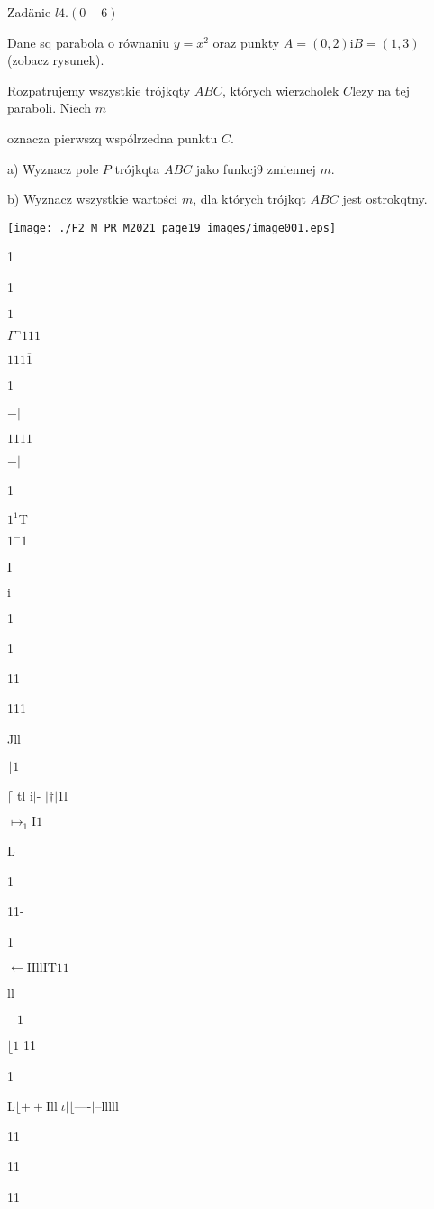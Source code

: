 \documentclass[a4paper,12pt]{article}
\begin{document}
Zadänie $l4. (0-6)$

Dane sq parabola o równaniu $y=x^{2}$ oraz punkty $A=(0,2) \mathrm{i} B=(1,3)$ (zobacz rysunek).

Rozpatrujemy wszystkie trójkqty $ABC$, których wierzcholek $C \mathrm{l}\mathrm{e}\dot{\mathrm{z}}\mathrm{y}$ na tej paraboli. Niech $m$

oznacza pierwszq wspólrzedna punktu $C.$

a) Wyznacz pole $P$ trójkqta $ABC$ jako funkcj9 zmiennej $m.$

b) Wyznacz wszystkie wartości $m$, dla których trójkqt $ABC$ jest ostrokqtny.
\begin{center}
\texttt{[image: ./F2\_M\_PR\_M2021\_page19\_images/image001.eps]}
\end{center}
1

1

$1$

$\Gamma^{\neg}111$

$111\overline{1}$

1

$-|$

$1111$

$-|$

1

$1^{1} \mathrm{T}$

$1^{-}1$

I

$\mathrm{i}$

1

1

11

111

Jll

$\rfloor 1$

$\lceil$ tl i$|$- $| \dagger|$1l

$\mapsto_{1}\mathrm{I}1$

L

1

11-

1

$\leftarrow \mathrm{I}\mathrm{I}\mathrm{l}\mathrm{l}\mathrm{I}\mathrm{T}11$

ll

$-1$

$\lfloor 1$ 11

1

L$\lfloor+ +$Ill$| \iota|\lfloor$----$|$--lllll

11

11

11
\end{document}
